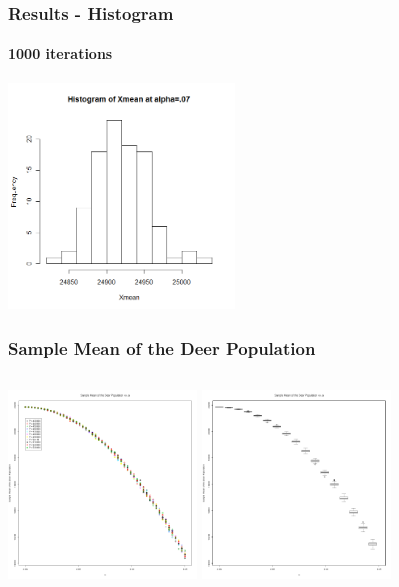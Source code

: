 \documentclass{beamer}   %
\begin{document}
\begin{frame}
    \frametitle{Results - Histogram}
        \framesubtitle{1000 iterations}
\includegraphics[height=6cm]{hist1000_xmean_alpha07}
\end{frame}



\begin{frame}
  \frametitle{Sample Mean of the Deer Population }
  \hspace*{-5mm}
  \begin{columns}
    \includegraphics[height=5cm]{meanDeerByAlpha}
    \includegraphics[height=5cm]{meanDeerByAlpha_boxplot}
  \end{columns}
\end{frame}
\end{document}
